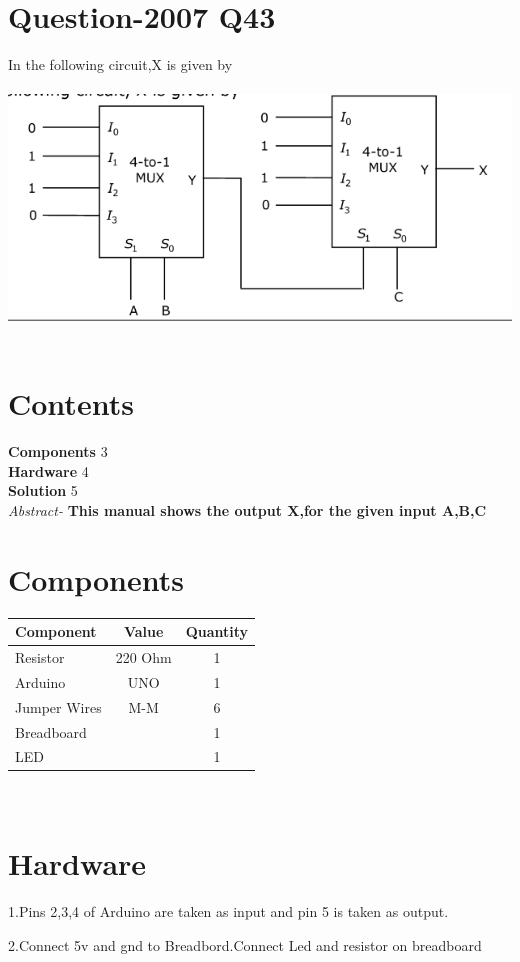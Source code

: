 \documentclass[10pt]{report}
\begin{document}
\begin{multicols}{2} 
\section{Question-2007  Q43}
In the following circuit,X is given by \\
\
\includegraphics[scale=0.40]{mux.png}\\
\
\section{Contents}
\raggedright
\textbf{Components}\hspace{4cm} 3
\\\textbf{Hardware}\hspace{4.7cm}   4
\\\textbf{Solution}
\hspace{5cm}   5\\
\vspace{1cm}
\textit{Abstract-}
\textbf{This manual shows the output X,for the given input A,B,C}
\section{Components}
\centering
\begin{tabular}{|l|c|c|}
\hline
Component & Value & Quantity\\
\hline
Resistor & 220 Ohm & 1\\
\hline
Arduino & UNO & 1\\
\hline
Jumper Wires & M-M & 6\\
\hline
Breadboard & & 1\\
\hline
LED & & 1\\
\hline
\end{tabular}\\
\section{Hardware}
\raggedright 1.Pins 2,3,4 of Arduino are taken as input and pin 5 is taken as output.\\
\raggedright 2.Connect 5v and gnd to Breadbord.Connect Led and resistor on breadboard\\
\centering

\end{multicols}
\end{document}
